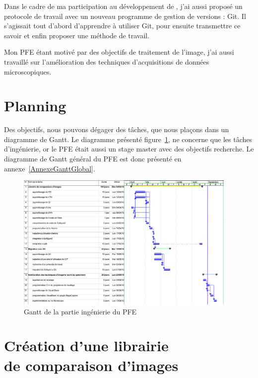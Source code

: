 Dans le cadre de ma participation au développement de \gofigure,
 j'ai aussi proposé un protocole de travail avec un nouveau programme de gestion de versions : Git.
 Il s'agissait tout d'abord d'apprendre à utiliser Git, pour ensuite transmettre ce savoir et enfin proposer une méthode de travail.

Mon PFE étant motivé par des objectifs de traitement de l'image, j'ai aussi travaillé sur l'amélioration
 des techniques d'acquisitions de données microscopiques.
 
 
\section*{Planning} 
 
Des objectifs, nous pouvons dégager des tâches, que nous plaçons dans un diagramme de Gantt. Le diagramme présenté figure~\ref{fig:GanttPFEInge}, ne concerne que les tâches d'ingénierie, or le PFE était aussi un stage master avec des objectifs recherche. Le diagramme de Gantt général du PFE est donc présenté en annexe~\ref{AnnexeGanttGlobal}.
 
\begin{figure}[h]
\begin{center}
\leavevmode
\includegraphics[angle=-90, width=0.95\textwidth]{pictures/GanttPFEInge}
\end{center}
\caption{Gantt de la partie ingénierie du PFE}
\label{fig:GanttPFEInge}
\end{figure}



\section{Création d'une librairie\\ de comparaison d'images}


